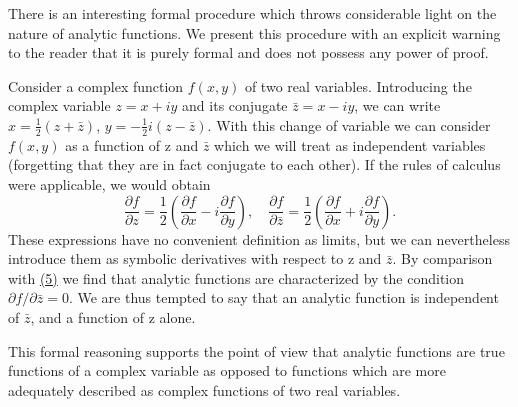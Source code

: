 There is an interesting formal procedure which throws considerable light on the nature of analytic functions. We present this procedure with an explicit warning to the reader that it is purely formal and does not possess any power of proof.

Consider a complex function $f(x,y)$ of two real variables. Introducing the complex variable $z = x + iy$ and its conjugate $\bar{z} = x - iy$, we can write $x = \frac{1}{2}(z + \bar{z})$, $y = -\frac{1}{2}i(z - \bar{z})$. With this change of variable we can consider $f(x,y)$ as a function of z and $\bar{z}$ which we will treat as independent variables (forgetting that they are in fact conjugate to each other). If the rules of calculus were applicable, we would obtain
\begin{equation*}
\frac {\partial f}{\partial z} = \frac {1}{2} \left(\frac {\partial f}{\partial x} - i \frac {\partial f}{\partial y}\right), \quad \frac {\partial f}{\partial \bar {z}} = \frac {1}{2} \left(\frac {\partial f}{\partial x} + i \frac {\partial f}{\partial y}\right).
\end{equation*}
These expressions have no convenient definition as limits, but we can nevertheless introduce them as symbolic derivatives with respect to z and $\bar{z}$. By comparison with \hyperref[eq:2.5]{(5)} we find that analytic functions are characterized by the condition $\partial f/\partial\bar{z}=0$. We are thus tempted to say that an analytic function is independent of $\bar{z}$, and a function of z alone.

This formal reasoning supports the point of view that analytic functions are true functions of a complex variable as opposed to functions which are more adequately described as complex functions of two real variables.

